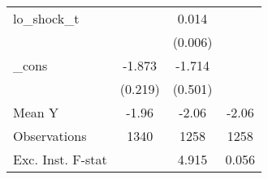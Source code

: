 {\begin{tabular}{l*{3}{c}}
\addlinespace
lo\_shock\_t  &                     &       0.014\sym{**} &                     \\
            &                     &     (0.006)         &                     \\
\addlinespace
\_cons      &      -1.873\sym{***}&      -1.714\sym{***}&                     \\
            &     (0.219)         &     (0.501)         &                     \\
\midrule
Mean Y      &       -1.96         &       -2.06         &       -2.06         \\
Observations&        1340         &        1258         &        1258         \\
Exc. Inst. F-stat&                     &       4.915         &       0.056         \\
\bottomrule
\end{tabular}
}

